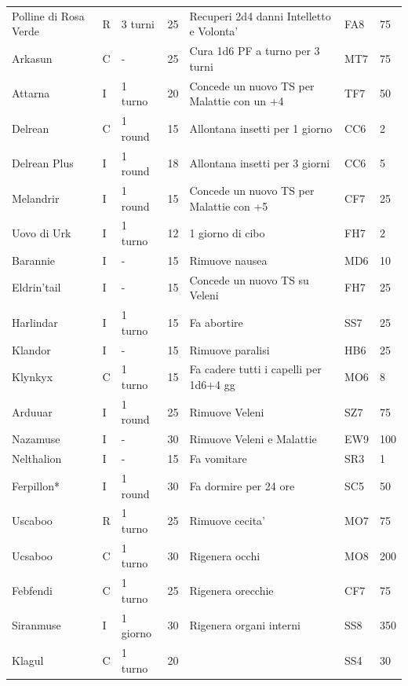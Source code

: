\documentclass[a4paper,11pt,twoside,openany]{book}
\begin{document}
{\begin{longtable}{|L{3.2cm} |k{0.7cm} |k{1.7cm}| D{1cm} |L{5cm} |k{1.5cm} |k{1cm}|}
			Polline di Rosa Verde & R & 3 turni & 25 & Recuperi 2d4 danni Intelletto e Volonta' & FA8 & 75\\
			Arkasun & C & - & 25 & Cura 1d6 PF a turno per 3 turni & MT7 & 75\\
			Attarna & I & 1 turno & 20 & Concede un nuovo TS per Malattie con un +4& TF7 & 50\\
			Delrean & C & 1 round & 15 & Allontana insetti per 1 giorno & CC6 & 2\\
			Delrean Plus & I & 1 round & 18 & Allontana insetti per 3 giorni & CC6 & 5\\
			Melandrir & I & 1 round & 15 & Concede un nuovo TS per Malattie con +5 & CF7 & 25\\
			Uovo di Urk & I & 1 turno & 12 & 1 giorno di cibo & FH7 & 2\\
			Barannie & I & - & 15 & Rimuove nausea & MD6 & 10\\
			Eldrin'tail & I & - & 15 & Concede un nuovo TS su Veleni & FH7 & 25\\
			Harlindar & I & 1 turno & 15 & Fa abortire & SS7 & 25\\
			Klandor & I & - & 15 & Rimuove paralisi & HB6 & 25\\
			Klynkyx & C & 1 turno & 15 & Fa cadere tutti i capelli per 1d6+4 gg & MO6 & 8\\
			Arduuar & I & 1 round & 25 & Rimuove Veleni & SZ7 & 75\\
			Nazamuse & I & - & 30 & Rimuove Veleni e Malattie & EW9 & 100\\
			Nelthalion & I & - & 15 & Fa vomitare & SR3 & 1\\
			Ferpillon{*} & I & 1 round & 30 & Fa dormire per 24 ore & SC5 & 50\\
			Uscaboo & R & 1 turno & 25 & Rimuove cecita' & MO7 & 75\\
			Ucsaboo  & C & 1 turno & 30 & Rigenera occhi & MO8 & 200\\
			Febfendi  & C & 1 turno & 25 & Rigenera orecchie & CF7 & 75\\
			Siranmuse & I & 1 giorno & 30 & Rigenera organi interni & SS8 & 350\\
			Klagul & C & 1 turno & 20 & & SS4 & 30\\

\end{longtable}}
\end{document}
